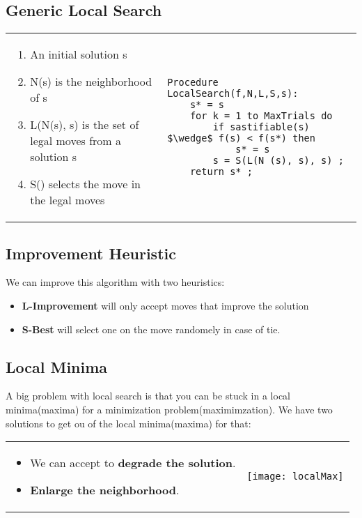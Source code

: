 
\subsection{Generic Local Search}
\begin{tabular}{m{9cm}m{6cm}}
\begin{enumerate}
    \item An initial solution s
    \item N(s) is the neighborhood of s
    \item L(N(s), s) is the set of legal moves from a solution s
    \item S() selects the move in the legal moves
\end{enumerate}
&
\begin{lstlisting}[mathescape]
Procedure LocalSearch(f,N,L,S,s):
    s* = s
    for k = 1 to MaxTrials do
        if sastifiable(s) $\wedge$ f(s) < f(s*) then
            s* = s
        s = S(L(N (s), s), s) ;
    return s* ;
\end{lstlisting}
\end{tabular}

\subsection{Improvement Heuristic}
We can improve this algorithm with two heuristics:
\begin{itemize}
    \item  \textbf{L-Improvement} will only accept moves that improve the solution
    \item \textbf{S-Best} will select one on the move randomely in case of tie.
\end{itemize}

\subsection{Local Minima}

A big problem with local search is that you can be stuck in a local minima(maxima) for a minimization problem(maximimzation).
We have two solutions to get ou of the local minima(maxima) for that:

\begin{tabular}{m{10cm}m{3cm}}
\begin{itemize}
    \item We can accept to \textbf{degrade the solution}.
    \item \textbf{Enlarge the neighborhood}.
\end{itemize}
&
\texttt{[image: localMax]}
\end{tabular}

